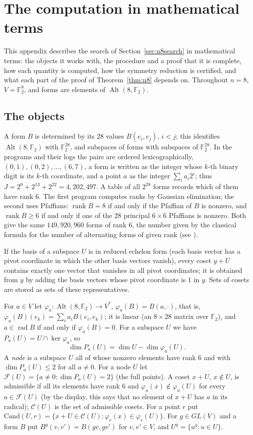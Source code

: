 \documentclass[11pt]{article}
\theoremstyle{definition}
\newcommand{\F}{\mathbb{F}}
\DeclareMathOperator{\Alt}{Alt}
\DeclareMathOperator{\rad}{rad}
\DeclareMathOperator{\rk}{rank}
\begin{document}
\appendix
\section{The computation in mathematical terms}\label{app:search}
This appendix describes the search of Section~\ref{sec:n8search} in mathematical terms: the
objects it works with, the procedure and a proof that it is complete, how each quantity is
computed, how the symmetry reduction is certified, and what each part of the proof of
Theorem~\ref{thm:n8} depends on. Throughout $n=8$, $V=\F_2^8$, and forms are elements of
$\Alt(8,\F_2)$.

\subsection{The objects}
A form $B$ is determined by its $28$ values $B(e_i,e_j)$, $i<j$; this identifies
$\Alt(8,\F_2)$ with $\F_2^{28}$, and subspaces of forms with subspaces of $\F_2^{28}$. In the
programs and their logs the pairs are ordered lexicographically, $(0,1),(0,2),\dots,(6,7)$, a
form is written as the integer whose $k$-th binary digit is its $k$-th coordinate, and a point
$a$ as the integer $\sum_ia_i2^i$; thus $J=2^0+2^{13}+2^{22}=4{,}202{,}497$. A table
of all $2^{28}$ forms records which of them have rank $6$. The first program computes ranks by
Gaussian elimination; the second uses Pfaffians: $\rk B=8$ if and only if the Pfaffian of $B$ is
nonzero, and $\rk B\ge6$ if and only if one of the $28$ principal $6\times6$ Pfaffians is
nonzero. Both give the same $149{,}920{,}960$ forms of rank $6$, the number given by the classical
formula for the number of alternating forms of given rank (see \cite{DG75}).

If the basis of a subspace $U$ is in reduced echelon form (each basis vector has a pivot
coordinate in which the other basis vectors vanish), every coset $y+U$ contains exactly one
vector that vanishes in all pivot coordinates; it is obtained from $y$ by adding the basis
vectors whose pivot coordinate is $1$ in $y$. Sets of cosets are stored as sets of these
representatives.

For $a\in V$ let $\varphi_a:\Alt(8,\F_2)\to V^*$, $\varphi_a(B)=B(a,\cdot)$, that is,
$\varphi_a(B)(e_k)=\sum_ia_iB(e_i,e_k)$; it is linear (an $8\times28$ matrix over $\F_2$), and
$a\in\rad B$ if and only if $\varphi_a(B)=0$. For a subspace $U$ we have
$P_a(U)=U\cap\ker\varphi_a$, so
\[
\dim P_a(U)=\dim U-\dim\varphi_a(U).
\]
A \emph{node} is a subspace $U$ all of whose nonzero elements have rank $6$ and with
$\dim P_a(U)\le2$ for all $a\neq0$. For a node $U$ let $\mathcal F(U)=\{a\neq0:\dim P_a(U)=2\}$ (the
full points). A coset $x+U$, $x\notin U$, is admissible if all its elements have rank $6$ and
$\varphi_a(x)\notin\varphi_a(U)$ for every $a\in\mathcal F(U)$ (by the display, this says that no
element of $x+U$ has $a$ in its radical); $\mathcal C(U)$ is the set of admissible cosets. For
a point $r$ put
$\mathrm{Cand}(U,r)=\{x+U\in\mathcal C(U):\varphi_r(x)\in\varphi_r(U)\}$.
For $g\in GL(V)$ and a form $B$ put $B^g(v,v')=B(gv,gv')$ for $v,v'\in V$, and
$U^g=\{u^g:u\in U\}$.
\end{document}
